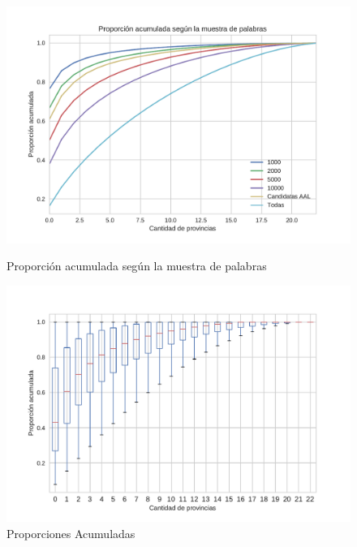 \begin{figure}[!ht]\centering
  \begin{minipage}{0.49\textwidth}
    \includegraphics[width=\linewidth]{./images/PropAcum.pdf}
    \caption{Proporción acumulada según la muestra de palabras} 
    \label{fig:propAcum} 
   \end{minipage}
   \begin{minipage}{0.49\textwidth}
    \includegraphics[width=\linewidth]{./images/PropAcum5000.pdf}
    \caption{Proporciones Acumuladas} 
    \label{fig:propAcum5000} 
   \end{minipage}
   
\end{figure}


